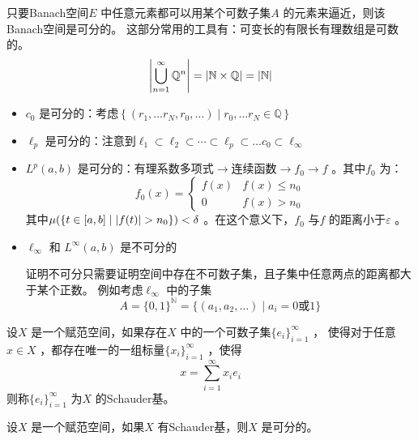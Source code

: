 只要Banach空间\(E\) 中任意元素都可以用某个可数子集\(A\) 的元素来逼近，则该Banach空间是可分的。
这部分常用的工具有：可变长的有限长有理数组是可数的。\[
    \left|\bigcup_{n=1}^{\infty} \mathbb{Q}^{n}\right| = \left|\mathbb{N}
    \times \mathbb{Q}\right| = \left|\mathbb{N}\right|
\]
\begin{example}
    \begin{itemize}
        \item \(c_{0}\) 是可分的：考虑\(\left\{ (r_{1},\dots r_{N}, r_{0},
            \dots ) \mid r_{0},\dots r_{N} \in \mathbb{Q} \right\}\)
        \item \(\ell_{p}\) 是可分的：注意到\(\ell_{1} \subset \ell_{2}
                \subset \cdots \subset \ell_{p} \subset \dots c_{0}
            \subset \ell_{\infty}\)
        \item \(L^{p}(a,b)\) 是可分的：\(\text{有理系数多项式} \to \text{连续函数}
            \to f_{0} \to f\) 。其中\(f_{0}\) 为：\[
                f_{0}(x) =
                \begin{cases}
                    f(x) & f(x) \leq n_{0}\\
                    0 & f(x) > n_{0}
                \end{cases}
            \]
            其中\(\mu(\left\{ t \in [a,b] \mid \left|f(t)\right| > n_{0}
            \right\})< \delta\) 。在这个意义下，\(f_{0}\) 与\(f\) 的距离小于\(\varepsilon\) 。
        \item \(\ell_{\infty}\) 和 \(L^{\infty}(a,b)\) 是不可分的

            证明不可分只需要证明空间中存在不可数子集，且子集中任意两点的距离都大于某个正数。
            例如考虑\(\ell_{\infty}\) 中的子集\[
                A = \{0,1\}^{\mathbb{N}} = \{ (a_{1},a_{2},\ldots)
                \mid a_{i} = 0 \text{或} 1 \}
            \]
    \end{itemize}
\end{example}

\begin{definition}
    设\(X\) 是一个赋范空间，如果存在\(X\) 中的一个可数子集\(\{e_{i}\}_{i=1}^{\infty}\) ，
    使得对于任意\(x \in X\) ，都存在唯一的一组标量\(\{x_{i}\}_{i=1}^{\infty}\) ，使得
    \[
        x = \sum_{i=1}^{\infty} x_{i} e_{i}
    \]
    则称\(\{e_{i}\}_{i=1}^{\infty}\) 为\(X\) 的Schauder基。
\end{definition}

\begin{theorem}
    设\(X\) 是一个赋范空间，如果\(X\) 有Schauder基，则\(X\) 是可分的。
\end{theorem}

